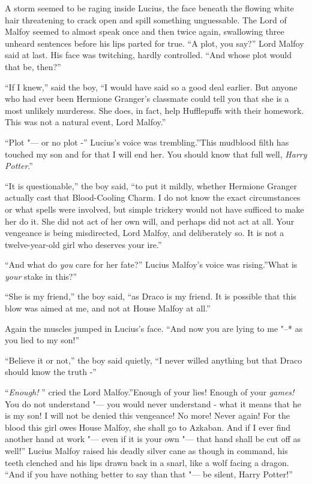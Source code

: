 A storm seemed to be raging inside Lucius, the face beneath the flowing
white hair threatening to crack open and spill something unguessable.
The Lord of Malfoy seemed to almost speak once and then twice again,
swallowing three unheard sentences before his lips parted for true. ``A
plot, you say?'' Lord Malfoy said at last. His face was twitching,
hardly controlled. ``And whose plot would that be, then?''

``If I knew,'' said the boy, ``I would have said so a good deal earlier.
But anyone who had ever been Hermione Granger's classmate could tell you
that she is a most unlikely murderess. She does, in fact, help
Hufflepuffs with their homework. This was not a natural event, Lord
Malfoy.''

``Plot "--- or no plot -'' Lucius's voice was trembling.''This mudblood
filth has touched my son and for that I will end her. You should know
that full well, \emph{Harry Potter}.''

``It is questionable,'' the boy said, ``to put it mildly, whether
Hermione Granger actually cast that Blood-Cooling Charm. I do not know
the exact circumstances or what spells were involved, but simple
trickery would not have sufficed to make her do it. She did not act of
her own will, and perhaps did not act at all. Your vengeance is being
misdirected, Lord Malfoy, and deliberately so. It is not a
twelve-year-old girl who deserves your ire.''

``And what do \emph{you} care for her fate?'' Lucius Malfoy's voice was
rising.''What is \emph{your} stake in this?''

``She is my friend,'' the boy said, ``as Draco is my friend. It is
possible that this blow was aimed at me, and not at House Malfoy at
all.''

Again the muscles jumped in Lucius's face. ``And now you are lying to me
"--* as you lied to my son!''

``Believe it or not,'' the boy said quietly, ``I never willed anything
but that Draco should know the truth -''

``\emph{Enough!} '' cried the Lord Malfoy.''Enough of your lies! Enough of
your \emph{games!} You do not understand "--- you would never understand -
what it means that he is my son! I will not be denied this vengeance! No
more! Never again! For the blood this girl owes House Malfoy, she shall
go to Azkaban. And if I ever find another hand at work "--- even if it is
your own "--- that hand shall be cut off as well!'' Lucius Malfoy raised
his deadly silver cane as though in command, his teeth clenched and his
lips drawn back in a snarl, like a wolf facing a dragon. ``And if you
have nothing better to say than that "--- be silent, Harry Potter!''

